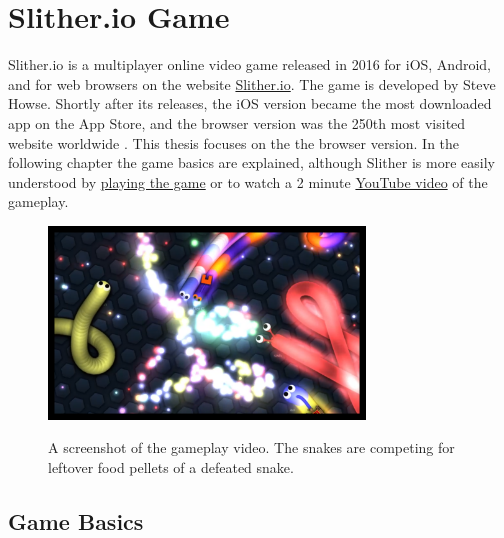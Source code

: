 \section{Slither.io Game}

Slither.io is a multiplayer online video game released in 2016 for iOS, Android, and for web browsers on the website \href{https://Slither.io}{Slither.io}. The game is developed by Steve Howse. Shortly after its releases, the iOS version became the most downloaded app on the App Store, and the browser version was the 250th most visited website worldwide \cite{web:Slitherio_Wikipedia}. This thesis focuses on the the browser version. In the following chapter the game basics are explained, although Slither is more easily understood by \href{https://Slither.io}{playing the game} or to watch a 2 minute \href{https://www.youtube.com/watch?v=cHDrFwX9ROE}{YouTube video} of the gameplay.

\begin{figure}[H]
    \centering
    \href{https://www.youtube.com/watch?v=cHDrFwX9ROE}{
        \includegraphics[width=0.75\textwidth]{Figures/Gameplay/Thumbnail Gameplay 3.png}}
    \caption{\centering A screenshot of the gameplay video. The snakes are competing for leftover food pellets of a defeated snake.}
    \label{fig:slitherio_youtube_gameplay}
\end{figure}


\subsection{Game Basics}

